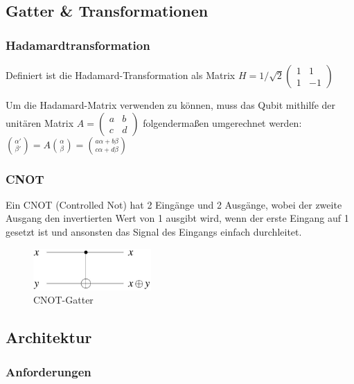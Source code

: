 \subsection{Gatter \& Transformationen}
\label{sec:Gatter u Transformationen}

\subsubsection{Hadamardtransformation}
\label{sec:Hadamardtransformation}

Definiert ist die Hadamard-Transformation als Matrix 
$H = 1/\sqrt{2}
\begin{pmatrix}
    1 &  1 \\
    1 & -1
\end{pmatrix}$

Um die Hadamard-Matrix verwenden zu können, muss das Qubit mithilfe der unitären Matrix
$A = \begin{pmatrix} 
    a & b \\
    c & d 
\end{pmatrix}$
folgendermaßen umgerechnet werden: $\binom{\alpha'}{\beta'} = A \binom{\alpha}{\beta} = {\binom{a\alpha + b\beta}{c\alpha + d\beta}}$


\subsubsection{CNOT}
\label{sec:CNOT}

Ein CNOT (Controlled Not) hat 2 Eingänge und 2 Ausgänge, wobei der zweite Ausgang den invertierten Wert von 1 ausgibt wird, wenn der erste Eingang auf 1 gesetzt ist und ansonsten das Signal des Eingangs einfach durchleitet.

\begin{figure}[!htb]
	\centering\includegraphics[width=0.4\textwidth]{images/cnot.jpg}
	\caption{CNOT-Gatter}
	\label{cnot}
\end{figure}


\subsection{Architektur}
\label{sec:Architektur}

\subsubsection{Anforderungen}
\label{sec:Anforderungen}

